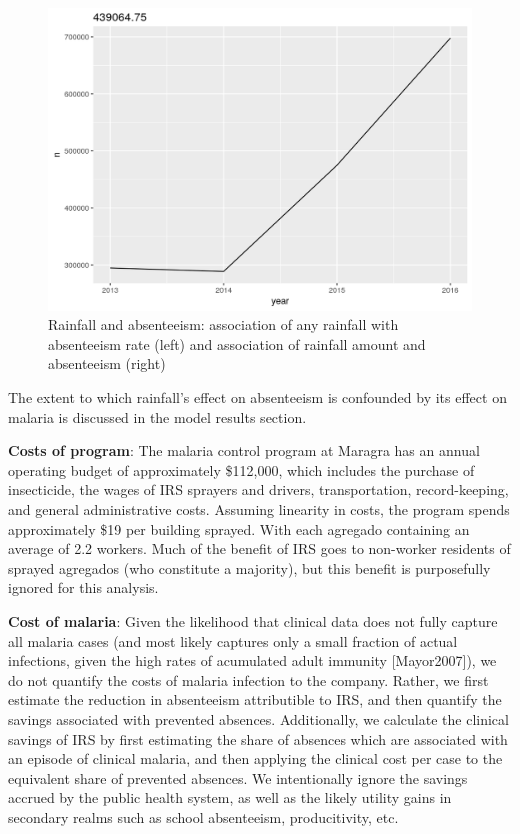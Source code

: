 \documentclass[]{article}
\begin{document}
\begin{figure}[!h]

{\centering \includegraphics{figures/unnamed-chunk-27-1} 

}

\caption{Rainfall and absenteeism: association of any rainfall with absenteeism rate (left) and association of rainfall amount and absenteeism (right)}\label{fig:unnamed-chunk-27}
\end{figure}

The extent to which rainfall's effect on absenteeism is confounded by
its effect on malaria is discussed in the model results section.

\textbf{Costs of program}: The malaria control program at Maragra has an
annual operating budget of approximately \$112,000, which includes the
purchase of insecticide, the wages of IRS sprayers and drivers,
transportation, record-keeping, and general administrative costs.
Assuming linearity in costs, the program spends approximately \$19 per
building sprayed. With each agregado containing an average of 2.2
workers. Much of the benefit of IRS goes to non-worker residents of
sprayed agregados (who constitute a majority), but this benefit is
purposefully ignored for this analysis.

\textbf{Cost of malaria}: Given the likelihood that clinical data does
not fully capture all malaria cases (and most likely captures only a
small fraction of actual infections, given the high rates of acumulated
adult immunity {[}Mayor2007{]}), we do not quantify the costs of malaria
infection to the company. Rather, we first estimate the reduction in
absenteeism attributible to IRS, and then quantify the savings
associated with prevented absences. Additionally, we calculate the
clinical savings of IRS by first estimating the share of absences which
are associated with an episode of clinical malaria, and then applying
the clinical cost per case to the equivalent share of prevented
absences. We intentionally ignore the savings accrued by the public
health system, as well as the likely utility gains in secondary realms
such as school absenteeism, producitivity, etc.
\end{document}
